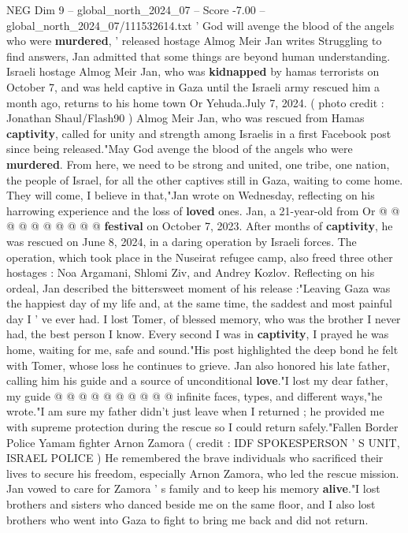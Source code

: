 \begin{textsample}{NEG Dim 9 – global\_north\_2024\_07 – Score -7.00 – global\_north\_2024\_07/111532614.txt}  \label{ex:f9_neg_156}
' God will avenge the blood of the angels who were \textbf{murdered}, ' released hostage Almog Meir Jan writes Struggling to find answers, Jan admitted that some things are beyond human understanding.
Israeli hostage Almog Meir Jan, who was \textbf{kidnapped} by hamas terrorists on October 7, and was held captive in Gaza until the Israeli army rescued him a month ago, returns to his home town Or Yehuda.July 7, 2024. ( photo credit : Jonathan Shaul/Flash90 ) Almog Meir Jan, who was rescued from Hamas \textbf{captivity}, called for unity and strength among Israelis in a first Facebook post since being released."May God avenge the blood of the angels who were \textbf{murdered}.
From here, we need to be strong and united, one tribe, one nation, the people of Israel, for all the other captives still in Gaza, waiting to come home.
They will come, I believe in that,"Jan wrote on Wednesday, reflecting on his harrowing experience and the loss of \textbf{loved} ones.
Jan, a 21-year-old from Or @ @ @ @ @ @ @ @ @ @ \textbf{festival} on October 7, 2023.
After months of \textbf{captivity}, he was rescued on June 8, 2024, in a daring operation by Israeli forces.
The operation, which took place in the Nuseirat refugee camp, also freed three other hostages : Noa Argamani, Shlomi Ziv, and Andrey Kozlov.
Reflecting on his ordeal, Jan described the bittersweet moment of his release :"Leaving Gaza was the happiest day of my life and, at the same time, the saddest and most painful day I ' ve ever had.
I lost Tomer, of blessed memory, who was the brother I never had, the best person I know.
Every second I was in \textbf{captivity}, I prayed he was home, waiting for me, safe and sound."His post highlighted the deep bond he felt with Tomer, whose loss he continues to grieve.
Jan also honored his late father, calling him his guide and a source of unconditional \textbf{love}."I lost my dear father, my guide @ @ @ @ @ @ @ @ @ @ infinite faces, types, and different ways,"he wrote."I am sure my father didn't just leave when I returned ; he provided me with supreme protection during the rescue so I could return safely."Fallen Border Police Yamam fighter Arnon Zamora ( credit : IDF SPOKESPERSON ' S UNIT, ISRAEL POLICE ) He remembered the brave individuals who sacrificed their lives to secure his freedom, especially Arnon Zamora, who led the rescue mission.
Jan vowed to care for Zamora ' s family and to keep his memory \textbf{alive}."I lost brothers and sisters who danced beside me on the same floor, and I also lost brothers who went into Gaza to fight to bring me back and did not return.

\end{textsample}
